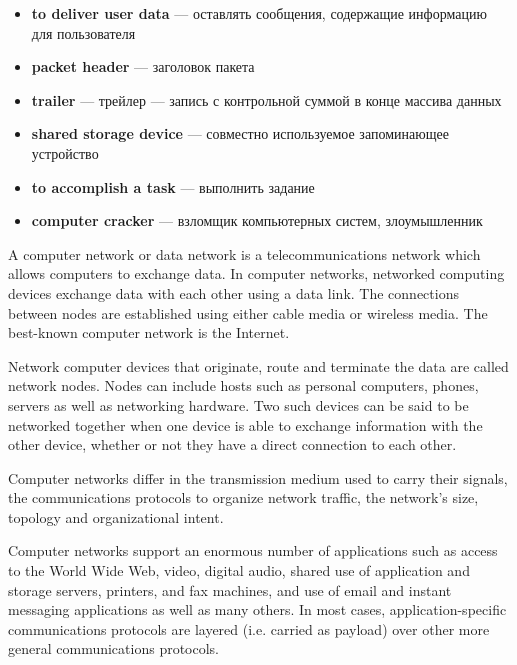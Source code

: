 \documentclass[a4paper]{article}
\begin{document}
\begin{enumerate}[label={\textbf{\Roman*.}},leftmargin=0pt,itemindent=*]
\begin{itemize}
    \item \textbf{to deliver user data} --- оставлять сообщения, содержащие
      информацию для пользователя

    \item \textbf{packet header} --- заголовок пакета

    \item \textbf{trailer} --- трейлер --- запись с контрольной суммой в конце
      массива данных

    \item \textbf{shared storage device} --- совместно используемое запоминающее
      устройство

    \item \textbf{to accomplish a task} --- выполнить задание

    \item \textbf{computer cracker} --- взломщик компьютерных систем,
      злоумышленник

  \end{itemize}

  \vspace{2ex}


    A computer network or data network is a telecommunications network which
    allows computers to exchange data. In computer networks, networked computing
    devices exchange data with each other using a data link. The connections
    between nodes are established using either cable media or wireless media.
    The best-known computer network is the Internet.

    Network computer devices that originate, route and terminate the data are
    called network nodes. Nodes can include hosts such as personal computers,
    phones, servers as well as networking hardware. Two such devices can be said
    to be networked together when one device is able to exchange information
    with the other device, whether or not they have a direct connection to each
    other.

    Computer networks differ in the transmission medium used to carry their
    signals, the communications protocols to organize network traffic, the
    network's size, topology and organizational intent.

    Computer networks support an enormous number of applications such as access
    to the World Wide Web, video, digital audio, shared use of application and
    storage servers, printers, and fax machines, and use of email and instant
    messaging applications as well as many others. In most cases,
    application-specific communications protocols are layered (i.e. carried as
    payload) over other more general communications protocols.


\end{enumerate}
\end{document}

